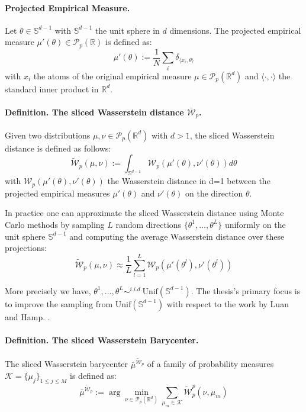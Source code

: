 \documentclass[12pt,a4paper]{report}
\begin{document}
\paragraph{Projected Empirical Measure.}
Let $\theta \in \mathbb{S}^{d-1}$  with $\mathbb{S}^{d-1}$ the unit sphere in $d$ dimensions.  
The projected empirical measure $\mu'(\theta) \in \mathcal{P}_{p}(\mathbb{R})$ is defined as:
\begin{equation}
\mu'(\theta) := \frac{1}{N} \sum_{i} \delta_{\langle x_i, \theta \rangle}
\end{equation}
with $x_i$ the atoms of the original empirical measure $\mu \in \mathcal{P}_p(\mathbb{R}^d)$ and $\langle \cdot, \cdot \rangle$ the standard inner product in $\mathbb{R}^d$. \cite{LuanHamp2025}


\paragraph{Definition. The sliced Wasserstein distance $\mathcal{\bar{W}}_p$.}
Given two distributions $\mu, \nu \in \mathcal{P}_p(\mathbb{R}^d)$ with $d>1$, the sliced Wasserstein distance is defined as follows: 
\begin{equation}
\mathcal{\widetilde{W}}_p(\mu, \nu) := \int_{\mathbb{S}^{d-1}} \mathcal{W}_p(\mu'(\theta), \nu'(\theta)) d\theta
\end{equation}
with $\mathcal{W}_p(\mu'(\theta), \nu'(\theta))$ the Wasserstein distance in d=1 between the projected empirical measures $\mu'(\theta)$ and $\nu'(\theta)$ on the direction $\theta$. \cite{LuanHamp2025}

In practice one can approximate the sliced Wasserstein distance using Monte Carlo methods by sampling $L$ random directions $\{\theta^1, \dots, \theta^L\}$ uniformly on the unit sphere $\mathbb{S}^{d-1}$ and computing the average Wasserstein distance over these projections:
\begin{equation}
\mathcal{\widetilde{W}}_p(\mu, \nu) \approx \frac{1}{L} \sum_{l=1}^{L} \mathcal{W}_p(\mu'(\theta^l), \nu'(\theta^l))
\end{equation}

More precisely we have, $\theta^1, \dots, \theta^L \sim^{i.i.d.} \text{Unif}(\mathbb{S}^{d-1})$.  \cite{RowlandEtAl2019}
The thesis's primary focus is to improve the sampling from $\text{Unif}(\mathbb{S}^{d-1})$ with respect to the work by Luan and Hamp. \cite{LuanHamp2025}.

\paragraph{Definition. The sliced Wasserstein Barycenter.}
The sliced Wasserstein barycenter $\bar{\mu}^{\widetilde{\mathcal{W}}_p}$ of a family of probability measures $\mathcal{K} = \{\mu_j\}_{1 \le j \le M}$ is defined as:
\begin{equation}
\bar{\mu}^{\widetilde{\mathcal{W}}_p} := \arg\min_{\nu \in \mathcal{P}_p(\mathbb{R}^d)} \sum_{\mu_m \in \mathcal{K}} \widetilde{\mathcal{W}}_p^p(\nu, \mu_m)
\end{equation}
\cite{LuanHamp2025}
\end{document}
